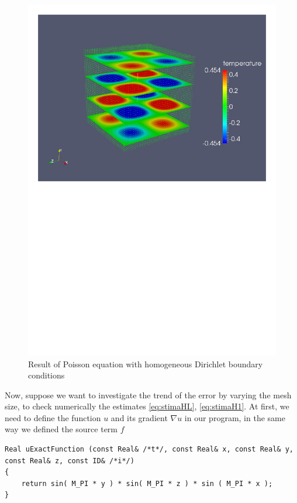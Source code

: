 \begin{itemize}
\begin{figure}
    \centering
    \includegraphics[width=\linewidth, trim=0cm 15cm 0cm 0cm, clip=true ]{pictures/slices}
    \caption{Result of Poisson equation with homogeneous Dirichlet boundary conditions}
    \label{fig:lap1}
\end{figure}
 
\newline \noindent
Now, suppose we want to investigate the trend of the error by varying the mesh size, to check numerically the estimates \eqref{eq:stimaHL}, \eqref{eq:stimaH1}. At first, we need to define the function $ u $ and its gradient $ \nabla u $ in our program, in the same way we defined the source term $f$
\begin{lstlisting}
Real uExactFunction (const Real& /*t*/, const Real& x, const Real& y, const Real& z, const ID& /*i*/)
{
    return sin( M_PI * y ) * sin( M_PI * z ) * sin ( M_PI * x );
}


\end{lstlisting}
\end{itemize}
